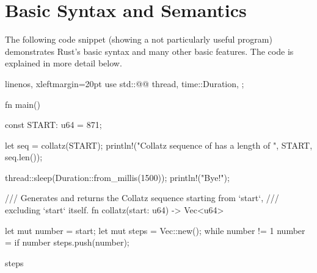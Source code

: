 \vspace{5mm}
\section{Basic Syntax and Semantics}

The following code snippet (showing a not particularly useful program) demonstrates Rust's basic syntax and many other basic features.
The code is explained in more detail below.

\begin{rustcode*}{linenos, xleftmargin=20pt}
use std::{@@
    thread,
    time::Duration,
};

fn main() {
    const START: u64 = 871;

    let seq = collatz(START);
    println!("Collatz sequence of {} has a length of {}", START, seq.len());

    thread::sleep(Duration::from_millis(1500));
    println!("Bye!");
}

/// Generates and returns the Collatz sequence starting from `start`,
/// excluding `start` itself.
fn collatz(start: u64) -> Vec<u64> {
    let mut number = start;
    let mut steps = Vec::new();
    while number != 1 {
        number = if number %
        steps.push(number);
    }

    steps
}
\end{rustcode*}


